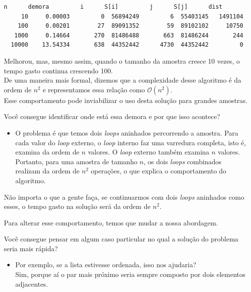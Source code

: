 \documentclass[11pt,a4paper]{article}
\providecommand{\tightlist}{%
      \setlength{\itemsep}{0pt}\setlength{\parskip}{0pt}}
\begin{document}
    \begin{Verbatim}[commandchars=\\\{\}]
      n      demora         i      S[i]         j      S[j]      dist
     10     0.00003         0  56894249         6  55403145   1491104
    100     0.00201        27  89091352        59  89102102     10750
   1000     0.14664       270  81486488       663  81486244       244
  10000    13.54334       638  44352442      4730  44352442         0

    \end{Verbatim}

    Melhorou, mas, mesmo assim, quando o tamanho da amostra cresce 10 vezes,
o tempo gasto continua crescendo 100.\\
De uma maneira mais formal, dizemos que a complexidade desse algoritmo é
da ordem de \(n^2\) e representamos essa relação como
\(\mathcal{O}(n^2)\).\\
Esse comportamento pode inviabilizar o uso desta solução para grandes
amostras.

Você consegue identificar onde está essa demora e por que isso acontece?

    \begin{itemize}
\tightlist
\item
  O problema é que temos dois \emph{loops} aninhados percorrendo a
  amostra. Para cada valor do \emph{loop} externo, o \emph{loop} interno
  faz uma varredura completa, isto é, examina da ordem de \(n\) valores.
  O \emph{loop} externo também examina \(n\) valores.\\
  Portanto, para uma amostra de tamanho \(n\), os dois \emph{loops}
  combinados realizam da ordem de \(n^2\) operações, o que explica o
  comportamento do algoritmo.
\end{itemize}

Não importa o que a gente faça, se continuarmos com dois \emph{loops}
aninhados como esses, o tempo gasto na solução será da ordem de \(n^2\).

Para alterar esse comportamento, temos que mudar a nossa abordagem.

    Você consegue pensar em algum caso particular no qual a solução do
problema seria mais rápida?

    \begin{itemize}
\tightlist
\item
  Por exemplo, se a lista estivesse ordenada, isso nos ajudaria?\\
  Sim, porque aí o par mais próximo seria sempre composto por dois
  elementos adjacentes.
\end{itemize}
\end{document}
